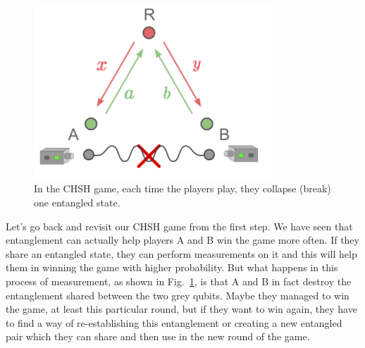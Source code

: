 \begin{figure}[H]
   \centering
    \includegraphics[width=0.8\textwidth]{lesson4/CHSH_broken_entanglement.pdf}
    \begin{center}
        \caption{In the CHSH game, each time the players play, they collapse (break) one entangled state.}
    \end{center}
    \label{fig:chsh-broken}
\end{figure}


Let's go back and revisit our CHSH game from the first step. We have seen that entanglement can actually help players A and B win the game more often. If they share an entangled state, they can perform measurements on it and this will help them in winning the game with higher probability. But what happens in this process of measurement, as shown in Fig.~\ref{fig:chsh-broken}, is that A and B in fact destroy the entanglement shared between the two grey qubits.  Maybe they managed to win the game, at least this particular round, but if they want to win again, they have to find a way of re-establishing this entanglement or creating a new entangled pair which they can share and then use in the new round of the game. 

